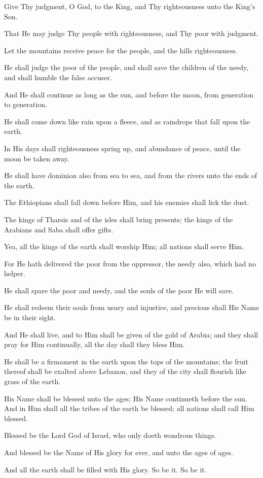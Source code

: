 Give Thy judgment, O God, to the King, and Thy righteousness unto the King's Son.

That He may judge Thy people with righteousness, and Thy poor with judgment.

Let the mountains receive peace for the people, and the hills righteousness.

He shall judge the poor of the people, and shall save the children of the needy, and shall humble the false accuser.

And He shall continue as long as the sun, and before the moon, from generation to generation.

He shall come down like rain upon a fleece, and as raindrops that fall upon the earth.

In His days shall righteousness spring up, and abundance of peace, until the moon be taken away.

He shall have dominion also from sea to sea, and from the rivers unto the ends of the earth.

The Ethiopians shall fall down before Him, and his enemies shall lick the dust.

The kings of Tharsis and of the isles shall bring presents; the kings of the Arabians and Saba shall offer gifts.

Yea, all the kings of the earth shall worship Him; all nations shall serve Him.

For He hath delivered the poor from the oppressor, the needy also, which had no helper.

He shall spare the poor and needy, and the souls of the poor He will save.

He shall redeem their souls from usury and injustice, and precious shall His Name be in their sight.

And He shall live, and to Him shall be given of the gold of Arabia; and they shall pray for Him continually, all the day shall they bless Him.

He shall be a firmament in the earth upon the tops of the mountains; the fruit thereof shall be exalted above Lebanon, and they of the city shall flourish like grass of the earth.

His Name shall be blessed unto the ages; His Name continueth before the sun. And in Him shall all the tribes of the earth be blessed; all nations shall call Him blessed.

Blessed be the Lord God of Israel, who only doeth wondrous things.

And blessed be the Name of His glory for ever, and unto the ages of ages.

And all the earth shall be filled with His glory. So be it. So be it.
